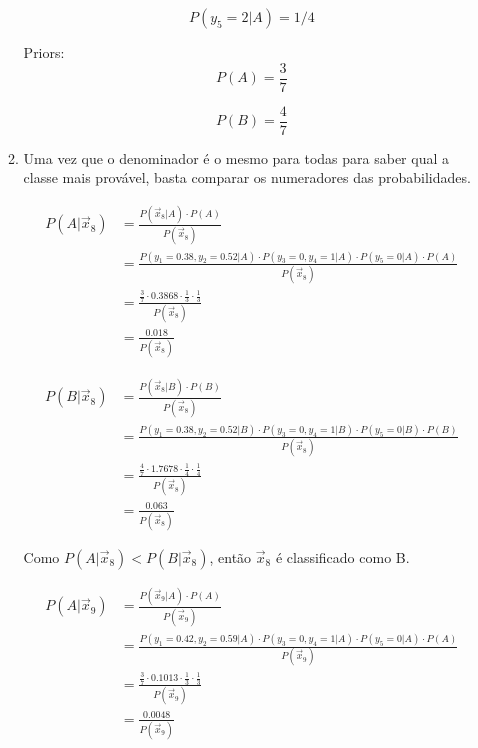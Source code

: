 \documentclass[a4paper,12pt]{article} %
\begin{document}
\begin{enumerate}
\begin{enumerate}
\begin{equation*}
    P(y_5=2|A) = 1/4
\end{equation*}

Priors:
\begin{equation*}    
    P(A) = \frac{3}{7}
\end{equation*}

\begin{equation*}    
    P(B) = \frac{4}{7}
\end{equation*}

\item Uma vez que o denominador é o mesmo para todas para saber qual a classe mais provável, basta comparar os numeradores das probabilidades.

\begin{equation*}
    \begin{aligned}
        P(A|\vec{x}_8) & = \frac{P(\vec{x}_8|A) \cdot P(A)}{P(\vec{x}_8)} \\
                       & = \frac{P(y_1=0.38,y_2=0.52|A) \cdot P(y_3=0,y_4=1|A) \cdot P(y_5=0|A) \cdot P(A)}{P(\vec{x}_8)} \\
                       & = \frac{\frac{3}{7} \cdot 0.3868 \cdot \frac{1}{3} \cdot \frac{1}{3}}{P(\vec{x}_8)} \\
                       & = \frac{0.018}{P(\vec{x}_8)}
    \end{aligned}
\end{equation*}
    
\begin{equation*}
    \begin{aligned}
        P(B|\vec{x}_8) & = \frac{P(\vec{x}_8|B) \cdot P(B)}{P(\vec{x}_8)} \\
                       & = \frac{P(y_1=0.38,y_2=0.52|B) \cdot P(y_3=0,y_4=1|B) \cdot P(y_5=0|B) \cdot P(B)}{P(\vec{x}_8)} \\
                       & = \frac{\frac{4}{7} \cdot 1.7678 \cdot \frac{1}{4} \cdot \frac{1}{4}}{P(\vec{x}_8)} \\
                       & = \frac{0.063}{P(\vec{x}_8)}
    \end{aligned}
\end{equation*}

Como $P(A|\vec{x}_8) < P(B|\vec{x}_8)$, então $\vec{x}_8$ é classificado como B.

\begin{equation*}
    \begin{aligned}
        P(A|\vec{x}_9) & = \frac{P(\vec{x}_9|A) \cdot P(A)}{P(\vec{x}_9)} \\
                       & = \frac{P(y_1=0.42,y_2=0.59|A) \cdot P(y_3=0,y_4=1|A) \cdot P(y_5=0|A) \cdot P(A)}{P(\vec{x}_9)} \\
                       & = \frac{\frac{3}{7} \cdot 0.1013 \cdot \frac{1}{3} \cdot \frac{1}{3}}{P(\vec{x}_9)} \\
                       & = \frac{0.0048}{P(\vec{x}_9)}
    \end{aligned}
\end{equation*}
    

\end{enumerate}
\end{enumerate}
\end{document}

